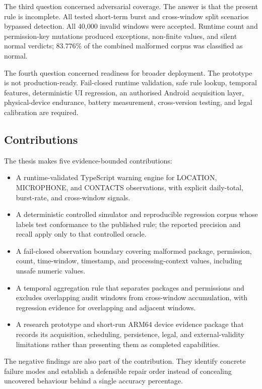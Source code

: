 The third question concerned adversarial coverage. The answer is that the present rule is incomplete. All tested short-term burst and cross-window split scenarios bypassed detection. All 40,000 invalid windows were accepted. Runtime count and permission-key mutations produced exceptions, non-finite values, and silent normal verdicts; 83.776\% of the combined malformed corpus was classified as normal.

The fourth question concerned readiness for broader deployment. The prototype is not production-ready. Fail-closed runtime validation, safe rule lookup, temporal features, deterministic UI regression, an authorised Android acquisition layer, physical-device endurance, battery measurement, cross-version testing, and legal calibration are required.

\subsection{Contributions}

The thesis makes five evidence-bounded contributions:

\begin{itemize}
    \item A runtime-validated TypeScript warning engine for LOCATION, MICROPHONE, and CONTACTS observations, with explicit daily-total, burst-rate, and cross-window signals.
    \item A deterministic controlled simulator and reproducible regression corpus whose labels test conformance to the published rule; the reported precision and recall apply only to that controlled oracle.
    \item A fail-closed observation boundary covering malformed package, permission, count, time-window, timestamp, and processing-context values, including unsafe numeric values.
    \item A temporal aggregation rule that separates packages and permissions and excludes overlapping audit windows from cross-window accumulation, with regression evidence for overlapping and adjacent windows.
    \item A research prototype and short-run ARM64 device evidence package that records its acquisition, scheduling, persistence, legal, and external-validity limitations rather than presenting them as completed capabilities.
\end{itemize}

The negative findings are also part of the contribution. They identify concrete failure modes and establish a defensible repair order instead of concealing uncovered behaviour behind a single accuracy percentage.

